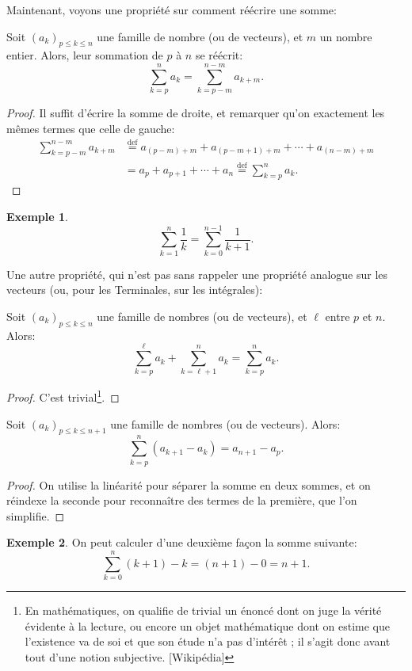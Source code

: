 \documentclass[twoside,12pt]{article}
\theoremstyle{definition}
\newtheorem{exe}{Exemple}
\theoremstyle{remark}
\theoremstyle{plain}
\newcommand\myeq{\overset{\mathrm{def}}{=}}
\begin{document}
Maintenant, voyons une propriété sur comment réécrire une somme:

\begin{prop}[Réindexation]
Soit $(a_k)_{p\leq k\leq n}$ une famille de nombre (ou de vecteurs), et $m$ un nombre entier. Alors, leur sommation de $p$ à $n$ se réécrit:
\[
\sum_{k=p}^n a_k = \sum_{k=p-m}^{n-m} a_{k+m}.
\]
\end{prop}

\begin{proof}
Il suffit d'écrire la somme de droite, et remarquer qu'on exactement les mêmes termes que celle de gauche:
\begin{align*}
\sum_{k=p-m}^{n-m} a_{k+m} &\myeq a_{(p-m)+m} + a_{(p-m+1) + m} + \cdots + a_{(n-m)+m}\\ &= a_p + a_{p+1} + \cdots + a_n \myeq \sum_{k=p}^n a_k.
\end{align*}
\end{proof}

\begin{exe}
\[
\sum_{k=1}^n \frac 1 k = \sum_{k=0}^{n-1} \frac 1 {k+1}.
\]
\end{exe}

Une autre propriété, qui n'est pas sans rappeler une propriété analogue sur les vecteurs (ou, pour les Terminales, sur les intégrales):

\begin{prop}
Soit $(a_k)_{p\leq k\leq n}$ une famille de nombres (ou de vecteurs), et $\ell$ entre $p$ et $n$. Alors:
\[
\sum_{k=p}^\ell a_k + \sum_{k=\ell+1}^n a_k = \sum_{k=p}^n a_k.
\]
\end{prop}

\begin{proof}
C'est trivial\footnote{En mathématiques, on qualifie de trivial un énoncé dont on juge la vérité évidente à la lecture, ou encore un objet mathématique dont on estime que l'existence va de soi et que son étude n'a pas d'intérêt ; il s'agit donc avant tout d'une notion subjective. [Wikipédia]}.
\end{proof}

\begin{prop}[Téléscopage]
Soit $(a_k)_{p\leq k\leq n+1}$ une famille de nombres (ou de vecteurs). Alors:
\[
\sum_{k=p}^n (a_{k+1} - a_k) = a_{n+1} - a_p.
\]
\end{prop}

\begin{proof}
On utilise la linéarité pour séparer la somme en deux sommes, et on réindexe la seconde pour reconnaître des termes de la première, que l'on simplifie.
\end{proof}

\begin{exe} On peut calculer d'une deuxième façon la somme suivante:
\[
\sum_{k=0}^n (k+1)-k = (n+1) - 0 = n+1.
\]
\end{exe}
\end{document}
